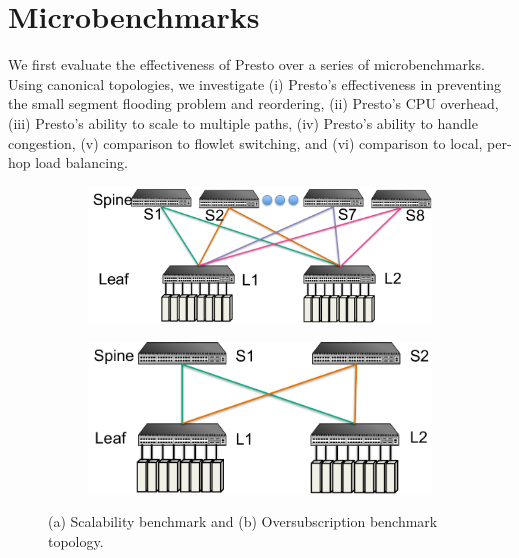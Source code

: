 \section{Microbenchmarks}
\label{sec:micro}

We first evaluate the effectiveness of Presto over a series of microbenchmarks. Using 
canonical topologies, we investigate (i) Presto's effectiveness in preventing the small segment
flooding problem and reordering, (ii) Presto's CPU overhead, (iii) Presto's ability to scale
to multiple paths, (iv) Presto's ability to handle congestion, (v) comparison to flowlet
switching, and (vi) comparison to local, per-hop load balancing.

\begin{figure}[t]
        \centering
	\begin{subfigure}[b]{0.225\textwidth}
        	\centering
  		\includegraphics[width=\textwidth]{presto/figures/micro_test_topology/micro_scalabilitytest_topology_refined.pdf}
        	\caption{}
		\label{micro_scalability_topology}
	\end{subfigure}
	\begin{subfigure}[b]{0.225\textwidth}
                \centering
		\includegraphics[width=\textwidth]{presto/figures/micro_test_topology/micro_congestiontest_topology_refined.pdf}
        	\caption{}
		\label{micro_congestion_topology}
	\end{subfigure}
	\caption{(a) Scalability benchmark and (b) Oversubscription benchmark topology.}
	\label{micro_topology}
\end{figure}

